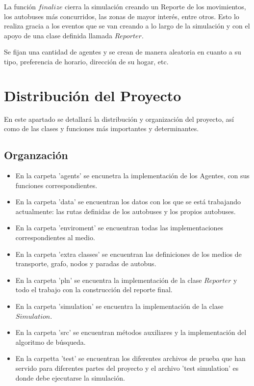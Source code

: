 \documentclass{article}
\begin{document}
La función $finalize$ cierra la simulación creando un Reporte de los movimientos, los autobuses más concurridos, las zonas de mayor interés, entre otros. Esto lo realiza gracia a los eventos que se van creando a lo largo de la simulación y con el apoyo de una clase definida llamada $Reporter$. 

Se fijan una cantidad de agentes y se crean de manera aleatoria en cuanto a su tipo, preferencia de horario, dirección de su hogar, etc. 
\section{Distribución del Proyecto}
En este apartado se detallará la distribución y organización del proyecto, así como de las clases y funciones más importantes y determinantes.

\subsection{Organzación}
\begin{itemize}
    \item En la carpeta 'agents' se encunetra la implementación de los Agentes, con sus funciones correspondientes.
    \item En la carpeta 'data' se encuentran los datos con los que se está trabajando actualmente: las rutas definidas de los autobuses y los propios autobuses.
    \item En la carpeta 'enviroment' se encuentran todas las implementaciones correspondientes al medio.
    \item En la carpeta 'extra classes' se encuentran las definiciones de los medios de transporte, grafo, nodos y paradas de autobus.
    \item En la carpeta 'pln' se encuentra la implementación de la clase $Reporter$ y todo el trabajo con la construcción del reporte final.
    \item En la carpeta 'simulation' se encuentra la implementación de la clase $Simulation$.
    \item En la carpeta 'src' se encuentran métodos auxiliares y la implementación del algoritmo de búsqueda.
    \item En la carpetta 'test' se encuentran los diferentes archivos de prueba que han servido para diferentes partes del proyecto y el archivo 'test simulation' es donde debe ejecutarse la simulación.
\end{itemize}
\end{document}
